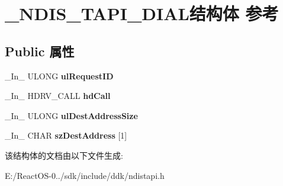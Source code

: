 \hypertarget{struct___n_d_i_s___t_a_p_i___d_i_a_l}{}\section{\+\_\+\+N\+D\+I\+S\+\_\+\+T\+A\+P\+I\+\_\+\+D\+I\+A\+L结构体 参考}
\label{struct___n_d_i_s___t_a_p_i___d_i_a_l}
\subsection*{Public 属性}
\begin{DoxyCompactItemize}
\item 
\mbox{\label{struct___n_d_i_s___t_a_p_i___d_i_a_l_a1de4ce02c7c55f360fd1401a2bbb0f2f}} 
\+\_\+\+In\+\_\+ U\+L\+O\+NG {\bfseries ul\+Request\+ID}
\item 
\mbox{\label{struct___n_d_i_s___t_a_p_i___d_i_a_l_a6479a88c06228aa9a5d177e51cd15720}} 
\+\_\+\+In\+\_\+ H\+D\+R\+V\+\_\+\+C\+A\+LL {\bfseries hd\+Call}
\item 
\mbox{\label{struct___n_d_i_s___t_a_p_i___d_i_a_l_a565383bd99f6c373617ebee8864211af}} 
\+\_\+\+In\+\_\+ U\+L\+O\+NG {\bfseries ul\+Dest\+Address\+Size}
\item 
\mbox{\label{struct___n_d_i_s___t_a_p_i___d_i_a_l_a29d64b109559c313b7607330f31d1729}} 
\+\_\+\+In\+\_\+ C\+H\+AR {\bfseries sz\+Dest\+Address} \mbox{[}1\mbox{]}
\end{DoxyCompactItemize}


该结构体的文档由以下文件生成\+:\begin{DoxyCompactItemize}
\item 
E\+:/\+React\+O\+S-\/0../sdk/include/ddk/ndistapi.\+h\end{DoxyCompactItemize}

